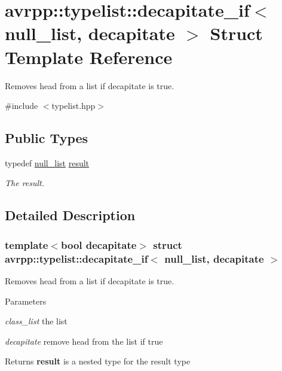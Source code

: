 \hypertarget{structavrpp_1_1typelist_1_1decapitate__if_3_01null__list_00_01decapitate_01_4}{
\section{avrpp::typelist::decapitate\_\-if$<$ null\_\-list, decapitate $>$ Struct Template Reference}
\label{structavrpp_1_1typelist_1_1decapitate__if_3_01null__list_00_01decapitate_01_4}
}


Removes head from a list if decapitate is true.  




{\ttfamily \#include $<$typelist.hpp$>$}

\subsection*{Public Types}
\begin{DoxyCompactItemize}
\item 
typedef \hyperlink{structavrpp_1_1typelist_1_1null__list}{null\_\-list} \hyperlink{structavrpp_1_1typelist_1_1decapitate__if_3_01null__list_00_01decapitate_01_4_ab919aa890d96ad3e2fc615a9902bb630}{result}
\begin{DoxyCompactList}\small\item\em The result. \item\end{DoxyCompactList}\end{DoxyCompactItemize}


\subsection{Detailed Description}
\subsubsection*{template$<$bool decapitate$>$ struct avrpp::typelist::decapitate\_\-if$<$ null\_\-list, decapitate $>$}

Removes head from a list if decapitate is true. 
\begin{DoxyParams}{Parameters}
\item[{\em class\_\-list}]the list \item[{\em decapitate}]remove head from the list if true \end{DoxyParams}
\begin{DoxyReturn}{Returns}
{\bfseries result} is a nested type for the result type 
\end{DoxyReturn}


